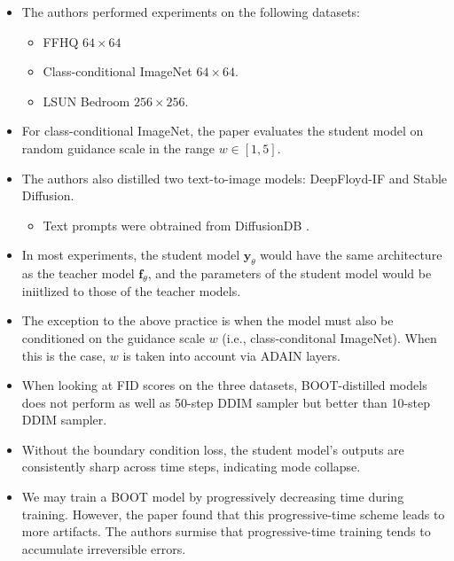 \documentclass[10pt]{article}
\newcommand{\ve}[1]{\mathbf{#1}}
\begin{document}
\begin{itemize}
  \item The authors performed experiments on the following datasets:
  \begin{itemize}
    \item FFHQ $64 \times 64$
    \item Class-conditional ImageNet $64 \times 64$.
    \item LSUN Bedroom $256 \times 256$.
  \end{itemize}

  \item For class-conditional ImageNet, the paper evaluates the student model on random guidance scale in the range $w \in [1,5]$.
  
  \item The authors also distilled two text-to-image models: DeepFloyd-IF and Stable Diffusion.
  \begin{itemize}
    \item Text prompts were obtrained from DiffusionDB \cite{Wang:2023}.
  \end{itemize}

  \item In most experiments, the student model $\ve{y}_{\theta}$ would have the same architecture as the teacher model $\ve{f}_{\theta}$, and the parameters of the student model would be iniitlized to those of the teacher models.
  
  \item The exception to the above practice is when the model must also be conditioned on the guidance scale $w$ (i.e., class-conditonal ImageNet). When this is the case, $w$ is taken into account via ADAIN layers.
  
  \item When looking at FID scores on the three datasets, BOOT-distilled models does not perform as well as 50-step DDIM sampler but better than 10-step DDIM sampler.
  
  \item Without the boundary condition loss, the student model's outputs are consistently sharp across time steps, indicating mode collapse.
  
  \item We may train a BOOT model by progressively decreasing time during training. However, the paper found that this progressive-time scheme leads to more artifacts. The authors surmise that progressive-time training tends to accumulate irreversible errors.
   
\end{itemize}


  
\end{document}
